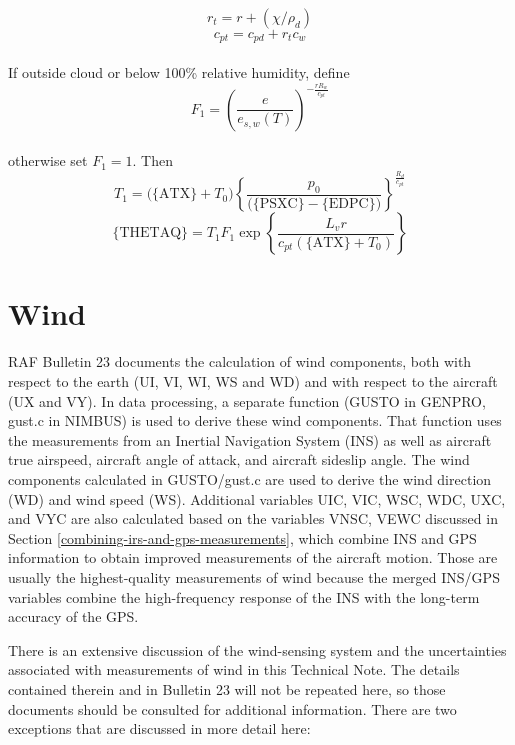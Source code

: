 \documentclass[
]{book}
\begin{document}
\begin{equation}
r_{t}=r+(\chi/\rho_{d})
\label{eq:rtotBox}
\end{equation}
\begin{equation}
c_{pt}=c_{pd}+r_{t}c_{w}
\label{eq:cptBox}
\end{equation}\\
If outside cloud or below 100\% relative humidity, define\\
\begin{equation}
F_{1}=\left(\frac{e}{e_{s,w}(T)}\right)^{-\frac{rR_{w}}{c_{pt}}}
\label{eq:F1}
\end{equation}\\
otherwise set \(F_{1}=1\). Then\\
\begin{equation}
T_{1}=\mathrm{(\{ATX\}}+T_{0})\left\{ \frac{p_{0}}{(\mathrm{\{PSXC\}}-\mathrm{\{EDPC\})}}\right\} ^{\frac{R_{d}}{c_{pt}}}
\label{eq:T1box}
\end{equation}
\begin{equation}
\mathrm{\{THETAQ\}}=T_{1}F_{1}\exp\left\{ \frac{L_{v}r}{c_{pt}(\{\mathrm{ATX\}}+T_{0})}\right\}
\label{eq:THETAQbox}
\end{equation}

\hypertarget{wind}{%
\section{Wind}\label{wind}}

RAF Bulletin 23 documents the calculation of wind components, both with respect to the earth (UI, VI, WI, WS and WD) and with respect to the aircraft (UX and VY). In data processing, a separate function (GUSTO in GENPRO, gust.c in NIMBUS) is used to derive these wind components. That function uses the measurements from an Inertial Navigation System (INS) as well as aircraft true airspeed, aircraft angle of attack, and aircraft sideslip angle. The wind components calculated in GUSTO/gust.c are used to derive the wind direction (WD) and wind speed (WS). Additional variables UIC, VIC, WSC, WDC, UXC, and VYC are also calculated based on the variables VNSC, VEWC discussed in Section \ref{combining-irs-and-gps-measurements}, which combine INS and GPS information to obtain improved measurements of the aircraft motion. Those are usually the highest-quality measurements of wind because the merged INS/GPS variables combine the high-frequency response of the INS with the long-term accuracy of the GPS.

There is an extensive discussion of the wind-sensing system and the uncertainties associated with measurements of wind in this Technical Note. The details contained therein and in Bulletin 23 will not be repeated here, so those documents should be consulted for additional information. There are two exceptions that are discussed in more detail here:
\end{document}
